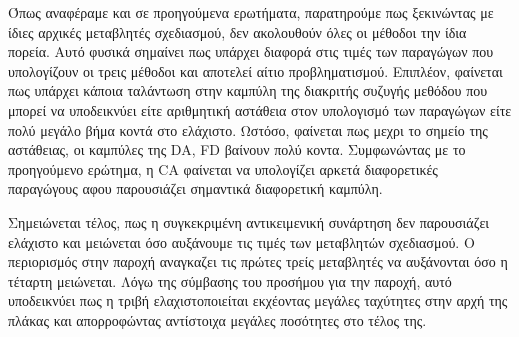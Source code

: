 Όπως αναφέραμε και σε προηγούμενα ερωτήματα, παρατηρούμε πως ξεκινώντας με ίδιες αρχικές μεταβλητές σχεδιασμού, δεν ακολουθούν όλες οι μέθοδοι την ίδια πορεία. Αυτό φυσικά σημαίνει πως υπάρχει διαφορά στις τιμές των παραγώγων που υπολογίζουν οι τρεις μέθοδοι και αποτελεί αίτιο προβληματισμού. Επιπλέον, φαίνεται πως υπάρχει κάποια ταλάντωση στην καμπύλη της διακριτής συζυγής μεθόδου που μπορεί να υποδεικνύει είτε αριθμητική αστάθεια στον υπολογισμό των παραγώγων είτε πολύ μεγάλο βήμα κοντά στο ελάχιστο. Ωστόσο, φαίνεται πως μεχρι το σημείο της αστάθειας, οι καμπύλες της DA, FD βαίνουν πολύ κοντα. Συμφωνώντας με το προηγούμενο ερώτημα, η CA φαίνεται να υπολογίζει αρκετά διαφορετικές παραγώγους αφου παρουσιάζει σημαντικά διαφορετική καμπύλη. 

Σημειώνεται τέλος, πως η συγκεκριμένη αντικειμενική συνάρτηση δεν παρουσιάζει ελάχιστο και μειώνεται όσο αυξάνουμε τις τιμές των μεταβλητών σχεδιασμού. Ο περιορισμός στην παροχή αναγκαζει τις πρώτες τρείς μεταβλητές να αυξάνονται όσο η τέταρτη μειώνεται. Λόγω της σύμβασης του προσήμου για την παροχή, αυτό υποδεικνύει πως η τριβή ελαχιστοποιείται εκχέοντας μεγάλες ταχύτητες στην αρχή της πλάκας και απορροφώντας αντίστοιχα μεγάλες ποσότητες στο τέλος της. 


